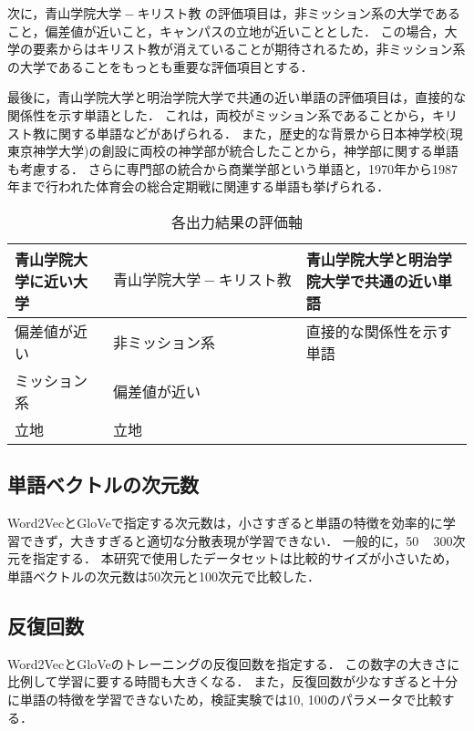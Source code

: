 次に，$ 青山学院大学 - キリスト教 $ の評価項目は，非ミッション系の大学であること，偏差値が近いこと，キャンパスの立地が近いこととした．
この場合，大学の要素からはキリスト教が消えていることが期待されるため，非ミッション系の大学であることをもっとも重要な評価項目とする．

最後に，青山学院大学と明治学院大学で共通の近い単語の評価項目は，直接的な関係性を示す単語とした．
これは，両校がミッション系であることから，キリスト教に関する単語などがあげられる．
また，歴史的な背景から日本神学校(現 東京神学大学)の創設に両校の神学部が統合したことから，神学部に関する単語も考慮する．
さらに専門部の統合から商業学部という単語と，1970年から1987年まで行われた体育会の総合定期戦に関連する単語も挙げられる．

\begin{table}[htbp]
\caption{各出力結果の評価軸}
\centering
\begin{tabular}{|l|l|l|}
\hline
青山学院大学に近い大学 & $ 青山学院大学 - キリスト教 $ & 青山学院大学と明治学院大学で共通の近い単語
\\ \hline \hline
偏差値が近い& 非ミッション系 & 直接的な関係性を示す単語 \\
ミッション系& 偏差値が近い & \\
立地 & 立地 & \\ \hline
\end{tabular}
\label{table:eval}
\end{table}


\subsection{単語ベクトルの次元数}
Word2VecとGloVeで指定する次元数は，小さすぎると単語の特徴を効率的に学習できず，大きすぎると適切な分散表現が学習できない．
一般的に，50 ~ 300次元を指定する．
本研究で使用したデータセットは比較的サイズが小さいため，単語ベクトルの次元数は50次元と100次元で比較した．

\subsection{反復回数}
Word2VecとGloVeのトレーニングの反復回数を指定する．
この数字の大きさに比例して学習に要する時間も大きくなる．
また，反復回数が少なすぎると十分に単語の特徴を学習できないため，検証実験では10, 100のパラメータで比較する．

